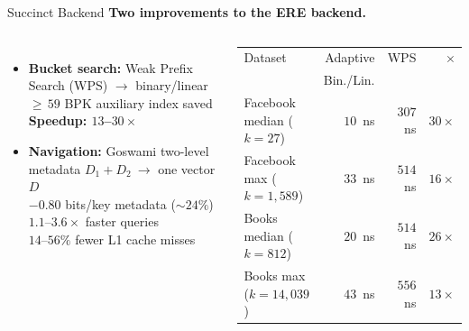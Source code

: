 \begin{frame}[c]{Succinct Backend}
    \ourbadge
    \textbf{Two improvements to the ERE backend.}
    \medskip

    \begin{columns}[T,onlytextwidth]
        \begin{itemize}
            \setlength{\itemsep}{0.7em}
            \item \textbf{Bucket search:} Weak Prefix Search (WPS) $\to$ binary/linear\\
                  ${\ge}\,59$ BPK auxiliary index saved\\
                  \textbf{Speedup: $13$--$30\times$}

            \item \textbf{Navigation:} Goswami two-level metadata $D_1 + D_2\ \to$ one vector $D$\\
                  $-0.80$ bits/key metadata ($\sim\!24\%$)\\
                  $1.1$--$3.6\times$ faster queries\\
                  $14$--$56\%$ fewer L1 cache misses
        \end{itemize}

        \centering
        \footnotesize
        \begin{tabular}{@{}lrrr@{}}
            \toprule
            Dataset                        & Adaptive      & WPS      & $\times$   \\
                                           & Bin./Lin.     &          &            \\
            \midrule
            Facebook median ($k\!=\!27$)   & $10$~ns  & $307$~ns & $30\times$ \\
            Facebook max ($k\!=\!1{,}589$) & $33$~ns  & $514$~ns & $16\times$ \\
            Books median ($k\!=\!812$)     & $20$~ns  & $514$~ns & $26\times$ \\
            Books max ($k\!=\!14{,}039$)   & $43$~ns  & $556$~ns & $13\times$ \\
            \bottomrule
        \end{tabular}
    \end{columns}
\end{frame}